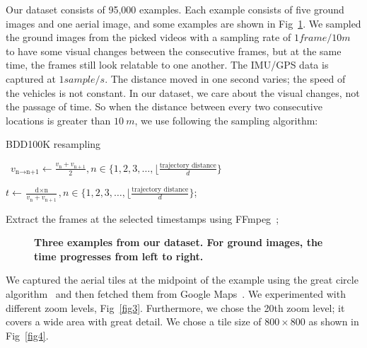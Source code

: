 \documentclass[10pt,letterpaper]{article}
\begin{document}
Our dataset consists of 95,000 examples. Each example consists of five ground images and one aerial image, and some examples are shown in Fig~\ref{fig2}. We sampled the ground images from the picked videos with a sampling rate of $1 frame/10 m$ to have some visual changes between the consecutive frames, but at the same time, the frames still look relatable to one another. The IMU/GPS data is captured at $1 sample/s$. The distance moved in one second varies; the speed of the vehicles is not constant. In our dataset, we care about the visual changes, not the passage of time. So when the distance between every two consecutive locations is greater than $10 \ m$,  we use following the sampling algorithm:

\begin{algorithm}[!h]
\caption{BDD100K resampling}
\
$v_{\text{n} \to \text{n+1}} \gets \frac{v_{\text{n}} + v_{\text{n} + 1}}{2}, n \in \{1, 2, 3, \text{\ldots}, \lfloor\frac{\text{trajectory distance}}{d} \}$ \;

\Comment{To get the timestamp of the nth frame ($t_{\text{n}}$)}

$t \gets \frac{\text{d} \times  \text{n}}{v_{\text{n}} + v_{\text{n} + 1}} , n \in \{1, 2, 3, \text{\ldots}, \lfloor\frac{\text{trajectory distance}}{d} \} $;\

Extract the frames at the selected timestamps using FFmpeg~\cite{bib23};\
\end{algorithm}

\begin{figure}[!h]
  \caption{{\bf Three examples from our dataset. For ground images, the time progresses from left to right.}}
  \label{fig2}
\end{figure}

We captured the aerial tiles at the midpoint of the example using the great circle algorithm~\cite{bib16} and then fetched them from Google Maps~\cite{bib15}. We experimented with different zoom levels, Fig~\ref{fig3}. Furthermore, we chose the 20th zoom level; it covers a wide area with great detail. We chose a tile size of  $800 \times 800$ as shown in Fig~\ref{fig4}.
\end{document}
